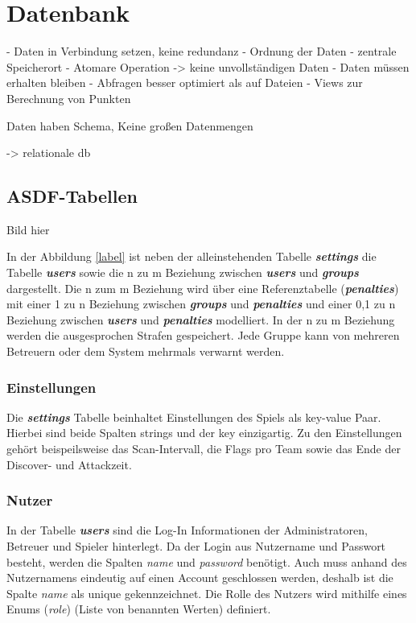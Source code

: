 \section{Datenbank}
- Daten in Verbindung setzen, keine redundanz
- Ordnung der Daten
- zentrale Speicherort
- Atomare Operation -> keine unvollständigen Daten
- Daten müssen erhalten bleiben
- Abfragen besser optimiert als auf Dateien
- Views zur Berechnung von Punkten

Daten haben Schema, Keine großen Datenmengen

-> relationale db

\subsection{ASDF-Tabellen}
Bild hier

In der Abbildung \ref{label} ist neben der alleinstehenden Tabelle \textbf{\textit{settings}} die Tabelle \textbf{\textit{users}} sowie die n zu m Beziehung zwischen \textbf{\textit{users}} und \textbf{\textit{groups}} dargestellt. Die n zum m Beziehung wird über eine Referenztabelle (\textbf{\textit{penalties}}) mit einer 1 zu n Beziehung zwischen \textbf{\textit{groups}} und \textbf{\textit{penalties}} und einer 0,1 zu n Beziehung zwischen \textbf{\textit{users}} und \textbf{\textit{penalties}} modelliert. In der n zu m Beziehung werden die ausgesprochen Strafen gespeichert. Jede Gruppe kann von mehreren Betreuern oder dem System mehrmals verwarnt werden.

\subsubsection{Einstellungen}
Die \textbf{\textit{settings}} Tabelle beinhaltet Einstellungen des Spiels als key-value Paar. Hierbei sind beide Spalten strings und der key einzigartig. Zu den Einstellungen gehört beispeilsweise das Scan-Intervall, die Flags pro Team sowie das Ende der Discover- und Attackzeit.

\subsubsection{Nutzer}
In der Tabelle \textbf{\textit{users}} sind die Log-In Informationen der Administratoren, Betreuer und Spieler hinterlegt. Da der Login aus Nutzername und Passwort besteht, werden die Spalten \textit{name} und \textit{password} benötigt. Auch muss anhand des Nutzernamens eindeutig auf einen Account geschlossen werden, deshalb ist die Spalte \textit{name} als unique gekennzeichnet. Die Rolle des Nutzers wird mithilfe eines Enums (\textit{role}) (Liste von benannten Werten) definiert.

